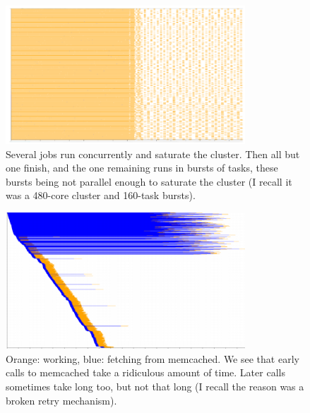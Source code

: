 \documentclass{article}
\begin{document}
\begin{figure}[p]
\center
\includegraphics[width=0.8\textwidth]{pics/splot/njobs-then-one.png}
\caption{Several jobs run concurrently and saturate the cluster. Then all but one finish, and the one remaining runs in bursts of tasks, these bursts being not parallel enough to saturate the cluster (I recall it was a 480-core cluster and 160-task bursts).}
\end{figure}

\begin{figure}[p]
\center
\includegraphics[width=0.8\textwidth]{pics/splot/very-slow-memcached.png}
\caption{Orange: working, blue: fetching from memcached. We see that early calls to memcached take a ridiculous amount of time. Later calls sometimes take long too, but not that long (I recall the reason was a broken retry mechanism).}
\end{figure}

\clearpage
\end{document}
